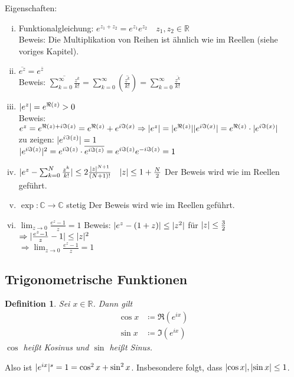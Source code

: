 \documentclass[ngerman,titlepage,twoside, parskip=half*]{scrreprt}
\newcommand*{\R}{\mathbb{R}}
\newcommand*{\C}{\mathbb{C}}
\theoremstyle{break}
\newtheorem{definition}{Definition}[chapter]
\theoremstyle{nonumberbreak}
\DeclarePairedDelimiter{\abs}{\lvert}{\rvert}
\begin{document}
Eigenschaften:
\begin{enumerate}[(i)]
  \item Funktionalgleichung: $e^{z_1+z_2}=e^{z_1}e^{z_2}\quad z_1,z_2\in\R$\\
    Beweis: Die Multiplikation von Reihen ist ähnlich wie im Reellen (siehe voriges Kapitel).
  \item $\overline{e^z}=e^{\overline{z}}$\\
    Beweis: $\overline{\sum_{k=0}^\infty \frac{z^k}{k!}}=\sum_{k=0}^\infty (\overline{\frac{z^k}{k!}})=
    \sum_{k=0}^\infty \frac{\overline{z^k}}{k!}$
  \item $\abs{e^z}=e^{\Re (z)}>0$\\
    Beweis: $e^z=e^{\Re (z)+i\Im (z)}=e^{\Re (z)}+e^{i\Im (x)}\Rightarrow \abs{e^z}=\abs{e^{\Re (z)}}\abs{e^{i\Im (x)}}
    =e^{\Re (z)}\cdot \abs{e^{i\Im (x)}}$\\
    zu zeigen: $\abs{e^{i\Im (z)}}=1$\\
    $\abs{e^{i\Im (z)}}^2=e^{i\Im (z)}\cdot \overline{e^{i\Im (z)}}=e^{i\Im (z)}e^{-i\Im (z)}=1$
  \item $\abs{e^z-\sum_{k=0}^N \frac{z^k}{k!}}\leq 2\frac{\abs{z}^{N+1}}{(N+1)!}\quad \abs{z}\leq 1+\frac{N}{2}$
    Der Beweis wird wie im Reellen geführt.
  \item $\exp\colon\C\rightarrow\C$ stetig
    Der Beweis wird wie im Reellen geführt.
  \item $\lim_{z\rightarrow 0}\frac{e^z-1}{z}=1$
    Beweis: $\abs{e^z-(1+z)}\leq \abs{z^2}$ für $\abs{z}\leq \frac{3}{2}$\\
    $\Rightarrow \abs{\frac{e^z-1}{z}-1}\leq \abs{z}^2$\\
    $\Rightarrow \lim_{z\rightarrow 0}\frac{{e^z}-1}{z}=1$
\end{enumerate}

\subsection{Trigonometrische Funktionen}
\begin{definition}
Sei $x\in\R$. Dann gilt
\begin{align*}
\cos x & \coloneqq \Re (e^{ix})\\
\sin x & \coloneqq \Im (e^{ix})
\end{align*}
$\cos$ heißt \emph{Kosinus} und $\sin$ heißt \emph{Sinus}.
\end{definition}

Also ist $\abs{e^{ix}}^s=1=\cos^2 x+\sin^2 x$. Insbesondere folgt, dass $\abs{\cos x}, \abs{\sin x}\leq 1$.
\end{document}
